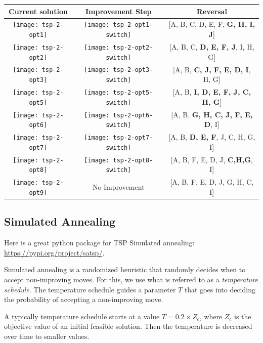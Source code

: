 \begin{longtable}{ccc}
\textbf{Current solution} & \textbf{Improvement Step} & \textbf{Reversal}\\
\hline
\texttt{[image: tsp-2-opt1]} & \texttt{[image: tsp-2-opt1-switch]} & 
[A, B, C, D, E, F, \textbf{G, H, I, J}]
\\
\texttt{[image: tsp-2-opt2]} & \texttt{[image: tsp-2-opt2-switch]} & 
[A, B, C, \textbf{D, E, F, J}, I, H, G]\\
\texttt{[image: tsp-2-opt3]} & \texttt{[image: tsp-2-opt3-switch]} & 
[A, B, \textbf{C, J, F, E, D, I}, H, G]
\\
\texttt{[image: tsp-2-opt5]} & \texttt{[image: tsp-2-opt5-switch]} & 
[A, B, \textbf{I, D, E, F, J, C, H, G}]
\\
\texttt{[image: tsp-2-opt6]} & \texttt{[image: tsp-2-opt6-switch]} & 
[A, B, \textbf{G, H, C, J, F, E, D}, I] 
\\
\texttt{[image: tsp-2-opt7]} & \texttt{[image: tsp-2-opt7-switch]} & 
[A, B, \textbf{D, E, F}, J, C, H, G, I] 
\\
\texttt{[image: tsp-2-opt8]} & \texttt{[image: tsp-2-opt8-switch]} & 
[A, B, F, E, D, J, \textbf{C,H,G}, I]  
\\
\texttt{[image: tsp-2-opt9]} & No Improvement& 
[A, B, F, E, D, J, G, H, C, I] 
\\
\hline
\hline
\end{longtable}



\subsection{Simulated Annealing}

Here is a great python package for TSP Simulated annealing: \url{https://pypi.org/project/satsp/}.

Simulated annealing is a randomized heuristic that randomly decides when to accept non-improving moves.  For this, we use what is referred to as a \emph{temperature schedule}.  The temperature schedule guides a parameter $T$ that goes into deciding the probability of accepting a non-improving move.

A typically temperature schedule starts at a value $T = 0.2 \times Z_c$, where $Z_c$ is the objective value of an initial feasible solution.  Then the temperature is decreased over time to smaller values.


